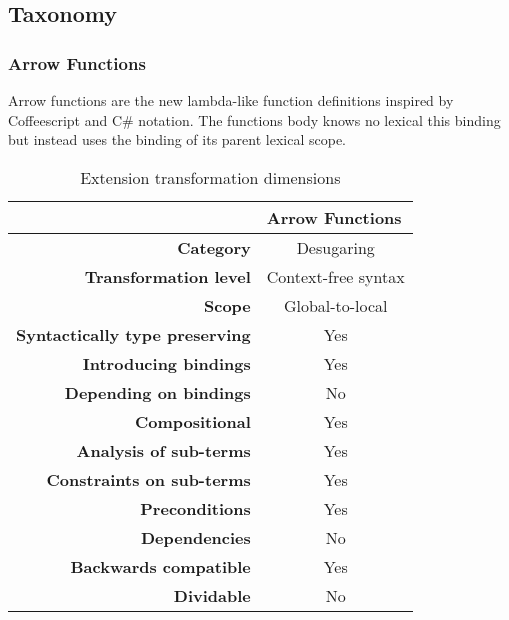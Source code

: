 \subsection{Taxonomy}

\subsubsection{Arrow Functions}
Arrow functions\cite[14.2]{SpecJS} are the new lambda-like function definitions inspired by Coffeescript and C\# notation. The functions body knows no lexical this binding but instead uses the binding of its parent lexical scope.

\begin{table}[h]
\centering
\caption{Extension transformation dimensions}
\label{arrow-function-table}
\begin{tabular}{@{}rc@{}}
\toprule
                                       & \multicolumn{1}{l}{\textbf{Arrow Functions}} \\ \midrule
\textbf{Category}                      & Desugaring
\\
\textbf{Transformation level}          & Context-free syntax                          \\
\textbf{Scope}                         & Global-to-local                               \\
\textbf{Syntactically type preserving} & Yes                                          \\
\textbf{Introducing bindings}          & Yes                                          \\%
\textbf{Depending on bindings}         & No                                           \\
\textbf{Compositional}                 & Yes                                          \\
\textbf{Analysis of sub-terms}          & Yes                                          \\
\textbf{Constraints on sub-terms}       & Yes                                           \\
\textbf{Preconditions}                 & Yes                                          \\
\textbf{Dependencies}                  & No                                           \\
\textbf{Backwards compatible}          & Yes                                          \\
\textbf{Dividable}                     & No                                           \\ \bottomrule
\end{tabular}
\end{table}

